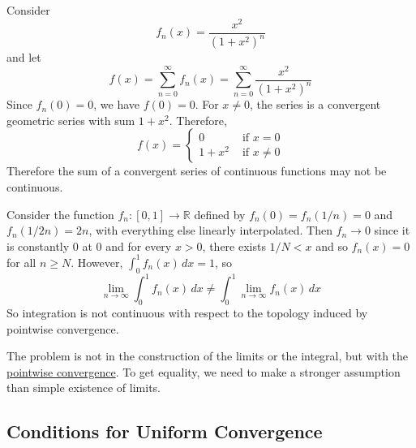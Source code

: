   \begin{example}
    \label{ex:pointwise-series-sum-of-continuous-functions-is}
    Consider 
    \begin{equation}
      f_n (x) = \frac{x^2}{(1 + x^2)^n}
    \end{equation}
    and let 
    \begin{equation}
      f(x) = \sum_{n=0}^\infty f_n (x) = \sum_{n=0}^\infty \frac{x^2}{(1 + x^2)^n}
    \end{equation}
    Since $f_n (0) = 0$, we have $f(0) = 0$. For $x \neq 0$, the series is a convergent geometric series with sum $1 + x^2$. Therefore, 
    \begin{equation}
      f(x) = \begin{cases} 
        0 & \text{ if } x = 0 \\ 
        1 + x^2 & \text{ if } x \neq 0
      \end{cases}
    \end{equation}
    Therefore the sum of a convergent series of continuous functions may not be continuous. 
  \end{example}

  \begin{example}
    \label{ex:cannot-exchange-integrals-and-limits-under}
    Consider the function $f_n: [0, 1] \to \mathbb{R}$ defined by $f_n (0) = f_n (1/n) = 0$ and $f_n (1/2n) = 2n$, with everything else linearly interpolated. Then $f_n \to 0$ since it is constantly $0$ at $0$ and for every $x > 0$, there exists $1/N < x$ and so $f_n (x) = 0$ for all $n \geq N$. However, $\int_0^1 f_n (x) \,dx = 1$, so 
    \begin{equation}
      \lim_{n \to \infty} \int_0^1 f_n (x)\,dx \neq \int_0^1 \lim_{n \to \infty} f_n (x)\,dx
    \end{equation}
    So integration is not continuous with respect to the topology induced by pointwise convergence. 
  \end{example}

  The problem is not in the construction of the limits or the integral, but with the \hyperref[def:pointwise-convergence]{pointwise convergence}. To get equality, we need to make a stronger assumption than simple existence of limits. 

\subsection{Conditions for Uniform Convergence}

